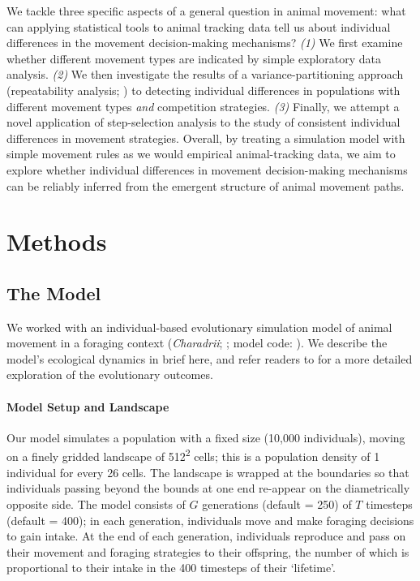     We tackle three specific aspects of a general question in animal movement: what can applying statistical tools to animal tracking data tell us about individual differences in the movement decision-making mechanisms?
    \textit{(1)} We first examine whether different movement types are indicated by simple exploratory data analysis.
    \textit{(2)} We then investigate the results of a variance-partitioning approach (repeatability analysis; \citealt{nakagawa2010,hertel2019}) to detecting individual differences in populations with different movement types \textit{and} competition strategies.
    \textit{(3)} Finally, we attempt a novel application of step-selection analysis to the study of consistent individual differences in movement strategies.
    Overall, by treating a simulation model with simple movement rules as we would empirical animal-tracking data, we aim to explore whether individual differences in movement decision-making mechanisms can be reliably inferred from the emergent structure of animal movement paths.
    
    \section*{Methods}
    
    \subsection*{The Model}
    
    We worked with an individual-based evolutionary simulation model of animal movement in a foraging context (\textit{Charadrii}; \citealt{gupte2021a}; model code: \citealt{netz2022a}).
    We describe the model's ecological dynamics in brief here, and refer readers to \cite{gupte2021a} for a more detailed exploration of the evolutionary outcomes.
    
    \paragraph*{Model Setup and Landscape}
    
    Our model simulates a population with a fixed size (10,000 individuals), moving on a finely gridded landscape of 512\textsuperscript{2} cells; this is a population density of 1 individual for every 26 cells.
    The landscape is wrapped at the boundaries so that individuals passing beyond the bounds at one end re-appear on the diametrically opposite side.
    The model consists of $G$ generations (default = 250) of $T$ timesteps (default = 400); in each generation, individuals move and make foraging decisions to gain intake.
    At the end of each generation, individuals reproduce and pass on their movement and foraging strategies to their offspring, the number of which is proportional to their intake in the 400 timesteps of their `lifetime'.
    
